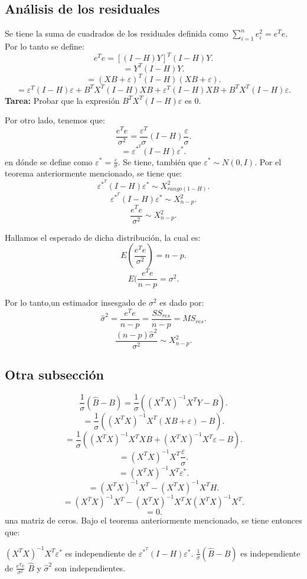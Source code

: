 \documentclass{article}
\begin{document}
\subsection{Análisis de los residuales}
Se tiene la suma de cuadrados de los residuales definida como $\sum_{i=1}^{n}e^{2}_{i}=e^{T}e$. Por lo tanto se define:
\[ e^{T}e=[(I-H)Y]^{T}(I-H)Y .\]
\[ =Y^{T}(I-H)Y .\]
\[ =(XB+\varepsilon)^{T}(I-H)(XB+\varepsilon) .\]
\[ =\varepsilon^{T}(I-H)\varepsilon + B^{T}X^{T}(I-H)XB+\varepsilon^{T}(I-H)XB+B^{T}X^{T}(I-H)\varepsilon .\]
\textbf{Tarea:} Probar que la expresión $B^{T}X^{T}(I-H)\varepsilon$ es 0.

Por otro lado, tenemos que:
\[ \frac{e^{T}e}{\sigma^{2}}=\frac{\varepsilon^{T}}{\sigma}(I-H)\frac{\varepsilon}{\sigma} .\]
\[ =\varepsilon^{*^{T}}(I-H)\varepsilon^{*} .\]
en dónde se define como $\varepsilon^{*}=\frac{\varepsilon}{\sigma}$. Se tiene, también que $\varepsilon^{*}\sim N(0,I)$. Por el teorema anteriormente mencionado, se tiene que:
\[ \varepsilon^{*^{T}}(I-H)\varepsilon^{*} \sim X^{2}_{rango(1-H)} .\]
\[ \varepsilon^{*^{T}}(I-H)\varepsilon^{*} \sim X^{2}_{n-p} .\]
\[ \frac{e^{T}e}{\sigma^{2}} \sim X^{2}_{n-p} .\]

Hallamos el esperado de dicha distribución, la cual es:
\[ E(\frac{e^{T}e}{\sigma^{2}}) = n-p .\]
\[ E(\frac{e^{T}e}{n-p}=\sigma^{2} .\]

Por lo tanto,un estimador insesgado de $\sigma^{2}$ es dado por:
\[ \hat{\sigma}^{2}=\frac{e^{T}e}{n-p}=\frac{SS_{res}}{n-p}=MS_{res}.\]
\[ \frac{(n-p)\hat{\sigma}^{2}}{\sigma^{2}}\sim X^{2}_{n-p} .\]

\subsection{Otra subsección}
\[ \frac{1}{\sigma}(\hat{B}-B)=\frac{1}{\sigma}((X^{T}X)^{-1}X^{T}Y-B) .\]
\[ =\frac{1}{\sigma}((X^{T}X)^{-1}X^{T}(XB+\varepsilon)-B) .\]
\[ =\frac{1}{\sigma}((X^{T}X)^{-1}X^{T}XB+(X^{T}X)^{-1}X^{T}\varepsilon-B) .\]
\[ =(X^{T}X)^{-1}X^{T}\frac{\varepsilon}{\sigma} .\]
\[ =(X^{T}X)^{-1}X^{T}\varepsilon^{*} .\]
\[ =(X^{T}X)^{-1}X^{T}-(X^{T}X)^{-1}X^{T}H .\]
\[ =(X^{T}X)^{-1}X^{T}-(X^{T}X)^{-1}X^{T}X(X^{T}X)^{-1}X^{T} .\]
\[ = 0 .\]
una matriz de ceros. Bajo el teorema anteriormente mencionado, se tiene entonces que:

$(X^{T}X)^{-1}X^{T}\varepsilon^{*}$ es independiente de $\varepsilon^{*^{T}}(I-H)\varepsilon^{*}$.
$\frac{1}{\sigma}(\hat{B}-B)$ es independiente de $\frac{e^{T}e}{\sigma^{2}}$
$\hat{B}$ y $\hat{\sigma}^{2}$ son independientes.
\end{document}
